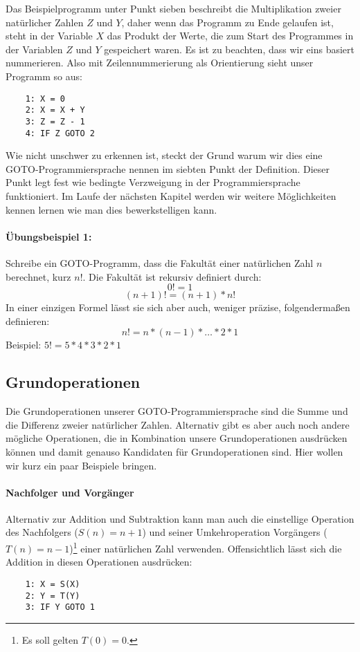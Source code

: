 \documentclass[11pt,a4paper,leqno]{report}
\numberwithin{equation}{chapter}
\begin{document}
Das Beispielprogramm unter Punkt sieben beschreibt die Multiplikation zweier natürlicher Zahlen $Z$ und $Y$, daher wenn das Programm zu Ende gelaufen ist, steht in der Variable $X$ das Produkt der Werte, die zum Start des Programmes in der Variablen $Z$ und $Y$ gespeichert waren. Es ist zu beachten, dass wir eins basiert nummerieren. Also mit Zeilennummerierung als Orientierung sieht unser Programm so aus:
\begin{lstlisting}
	1: X = 0
	2: X = X + Y
	3: Z = Z - 1
	4: IF Z GOTO 2
\end{lstlisting}			
Wie nicht unschwer zu erkennen ist, steckt der Grund warum wir dies eine GOTO-Programmiersprache nennen im siebten Punkt der Definition. Dieser Punkt legt fest wie bedingte Verzweigung in der Programmiersprache funktioniert. Im Laufe der nächsten Kapitel werden wir weitere Möglichkeiten kennen lernen wie man dies bewerkstelligen kann.
\paragraph{Übungsbeispiel 1:} Schreibe ein GOTO-Programm, dass die Fakultät einer natürlichen Zahl $n$ berechnet, kurz $n!$. Die Fakultät ist rekursiv definiert durch:
$$0! = 1$$
$$(n + 1)! = (n + 1) * n!$$
In einer einzigen Formel lässt sie sich aber auch, weniger präzise, folgendermaßen definieren:
$$n! = n * (n - 1) * \dots * 2 * 1$$
Beispiel: $5! = 5 * 4 * 3 * 2 * 1$
\subsection{Grundoperationen}
Die Grundoperationen unserer GOTO-Programmiersprache sind die Summe und die Differenz zweier natürlicher Zahlen. Alternativ gibt es aber auch noch andere mögliche Operationen, die in Kombination unsere Grundoperationen ausdrücken können und damit genauso Kandidaten für Grundoperationen sind. Hier wollen wir kurz ein paar Beispiele bringen.
\paragraph{Nachfolger und Vorgänger}
Alternativ zur Addition und Subtraktion kann man auch die einstellige Operation des Nachfolgers ($S(n) = n + 1$) und seiner Umkehroperation Vorgängers ($T(n) = n - 1$)\footnote{Es soll gelten $T(0)=0$.} einer natürlichen Zahl verwenden. Offensichtlich lässt sich die Addition in diesen Operationen ausdrücken:
\begin{lstlisting}
	1: X = S(X)
	2: Y = T(Y)
	3: IF Y GOTO 1
\end{lstlisting}	
\end{document}
